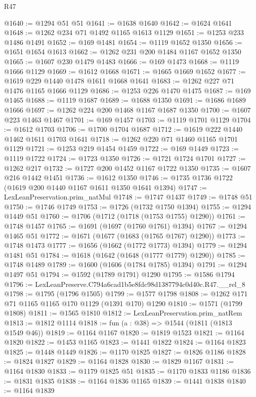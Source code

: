 \begin{lexlean}{R47}
\begin{coremodule}
@1640 := @1294 @51 @51
@1641 := @1638 @1640
@1642 := @1624 @1641
@1648 := @1262 @234 @71 @1492 @1165 @1613 @1129
@1651 := @1253 @233 @1486 @1491
@1652 := @169 @1481
@1654 := @1119 @1652 @1350
@1656 := @1651 @1654 @1613
@1662 := @1262 @231 @200 @1484 @1167 @1652 @1350
@1665 := @1607 @230 @1479 @1483
@1666 := @169 @1473
@1668 := @1119 @1666 @1129
@1669 := @1612 @1668
@1671 := @1665 @1669 @1652
@1677 := @1619 @229 @1440 @1478 @1611 @1668 @1641
@1683 := @1262 @227 @71 @1476 @1165 @1666 @1129
@1686 := @1253 @226 @1470 @1475
@1687 := @169 @1465
@1688 := @1119 @1687
@1689 := @1688 @1350
@1691 := @1686 @1689 @1666
@1697 := @1262 @224 @200 @1468 @1167 @1687 @1350
@1700 := @1607 @223 @1463 @1467
@1701 := @169 @1457
@1703 := @1119 @1701 @1129
@1704 := @1612 @1703
@1706 := @1700 @1704 @1687
@1712 := @1619 @222 @1440 @1462 @1611 @1703 @1641
@1718 := @1262 @220 @71 @1460 @1165 @1701 @1129
@1721 := @1253 @219 @1454 @1459
@1722 := @169 @1449
@1723 := @1119 @1722
@1724 := @1723 @1350
@1726 := @1721 @1724 @1701
@1727 := @1262 @217
@1732 := @1727 @200 @1452 @1167 @1722 @1350
@1735 := @1607 @216 @1442 @1451
@1736 := @1612 @1350
@1746 := @1735 @1736 @1722 (@1619 @200 @1440 @1167 @1611 @1350 @1641 @1394)
@1747 := LexLeanPreservation.prim_natMul
@1748 := @1747 @1437
@1749 := @1748 @51
@1750 := @1746 @1749
@1753 := @1726 (@1732 @1750 @1394)
@1755 := @1294 @1449 @51
@1760 := @1706 (@1712 (@1718 (@1753 @1755) @1290))
@1761 := @1748 @1457
@1765 := @1691 (@1697 (@1760 @1761) @1394)
@1767 := @1294 @1465 @51
@1772 := @1671 (@1677 (@1683 (@1765 @1767) @1290))
@1773 := @1748 @1473
@1777 := @1656 (@1662 (@1772 @1773) @1394)
@1779 := @1294 @1481 @51
@1784 := @1618 (@1642 (@1648 (@1777 @1779) @1290))
@1785 := @1748 @1489
@1789 := @1600 (@1606 (@1784 @1785) @1394)
@1791 := @1294 @1497 @51
@1794 := @1592 (@1789 @1791) @1290
@1795 := @1586 @1794
@1796 := LexLeanPreserve.C794a6cad1b5e8fdc98d1387794c0d40c.R47.__rel_8
@1798 := @1795 (@1796 @1505)
@1799 := @1577 @1798
@1808 := @1262 @171 @71 @1165 @1165 @170 @1129 (@1391 @170) @1290
@1810 := @1571 (@1799 @1808)
@1811 := @1565 @1810
@1812 := LexLeanPreservation.prim_natRem
@1813 := @1812 @1114
@1818 := fun (a : @38) => @1544 (@1811 (@1813 @1549 @46))
@1819 := @1164 @1167
@1820 := @1819 @1523
@1821 := @1164 @1820
@1822 := @1453 @1165
@1823 := @1441 @1822
@1824 := @1164 @1823
@1825 := @1448 @1449
@1826 := @1170 @1825
@1827 := @1826 @1186
@1828 := @1824 @1827
@1829 := @1164 @1828
@1830 := @1829 @1167
@1831 := @1164 @1830
@1833 := @1179 @1825 @51
@1835 := @1170 @1833 @1186
@1836 := @1831 @1835
@1838 := @1164 @1836 @1165
@1839 := @1441 @1838
@1840 := @1164 @1839

\end{coremodule}
\end{lexlean}
